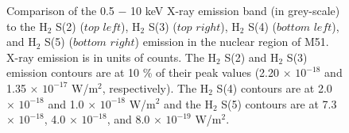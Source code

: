 \documentclass[manuscript]{aastex}
\begin{document}
\clearpage

\begin{figure}[!h]
\caption{Comparison of the 0.5 $-$ 10 keV X-ray emission band (in grey-scale) to the 
$\mathrm{H_2}$ S(2) ($top$ $left$), $\mathrm{H_2}$ S(3) ($top$ $right$), 
$\mathrm{H_2}$ S(4) ($bottom$ $left$), and $\mathrm{H_2}$ S(5) ($bottom$ $right$) 
emission in the nuclear region of M51.  X-ray emission is in units of counts.  
The $\mathrm{H_2}$ S(2) and $\mathrm{H_2}$ S(3) emission contours are at 
10 \% of their peak values (2.20 $\times$ ${10^{-18}}$ and 1.35 $\times$ ${10^{-17}}$ 
W/$\mathrm{m^2}$, respectively).  The $\mathrm{H_2}$ S(4) contours are at  
2.0 $\times$ ${10^{-18}}$ and 1.0 $\times$ ${10^{-18}}$ W/$\mathrm{m^2}$ and 
the $\mathrm{H_2}$ S(5) contours are at 7.3 $\times$ ${10^{-18}}$, 4.0 
$\times$ ${10^{-18}}$, and 8.0 $\times$ ${10^{-19}}$ W/$\mathrm{m^2}$.}
\end{figure}


\clearpage



\end{document}
